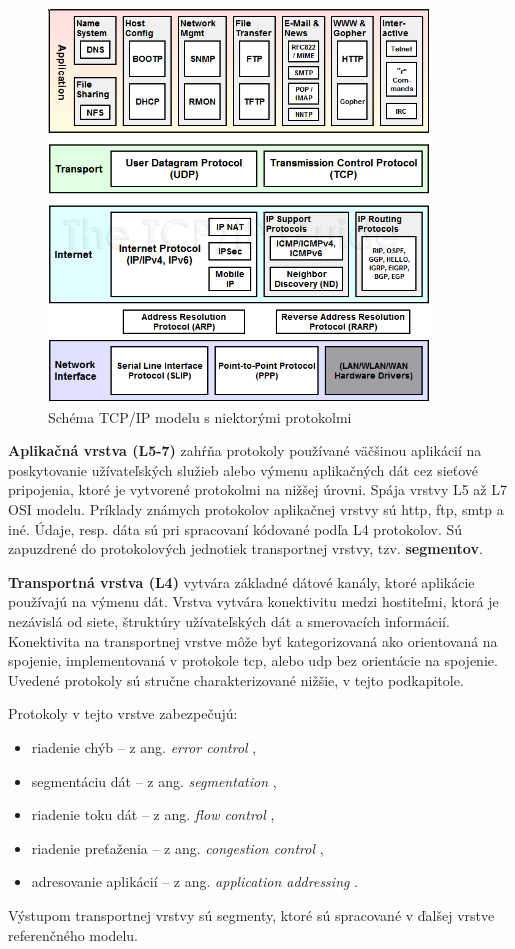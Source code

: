 \begin{figure}[!ht]
	\centering
	\includegraphics[width=0.9\textwidth]{figures/tcpipprot}
	\caption{Schéma TCP/IP modelu s niektorými protokolmi}
	\label{tcpipprot}
\end{figure}

\textbf{Aplikačná vrstva (L5-7)} zahŕňa protokoly používané väčšinou aplikácií na poskytovanie užívateľských služieb alebo výmenu aplikačných dát cez sieťové pripojenia, ktoré je vytvorené protokolmi na nižšej úrovni.  Spája vrstvy L5 až L7 OSI modelu. Príklady známych protokolov aplikačnej vrstvy sú \acrfull{http}, \acrfull{ftp}, \acrfull{smtp} a iné. Údaje, resp. dáta sú pri spracovaní kódované podľa L4 protokolov. Sú zapuzdrené do protokolových jednotiek transportnej vrstvy, tzv. \textbf{segmentov}.  

\textbf{Transportná vrstva (L4)} vytvára základné dátové kanály, ktoré aplikácie používajú na výmenu dát. Vrstva vytvára konektivitu medzi hostiteľmi, ktorá je nezávislá od siete, štruktúry užívateľských dát a smerovacích informácií. Konektivita na transportnej vrstve môže byť kategorizovaná ako orientovaná na spojenie, implementovaná v protokole \acrshort{tcp}, alebo \acrshort{udp} bez orientácie na spojenie. Uvedené protokoly sú stručne charakterizované nižšie, v tejto podkapitole. 

Protokoly v tejto vrstve zabezpečujú:
\begin{itemize}
	\item{riadenie chýb} -- z ang. \textit{error control} \cite{ec},
	\item{segmentáciu dát} -- z ang. \textit{segmentation} \cite{sd},
	\item{riadenie toku dát} -- z ang. \textit{flow control} \cite{fc},
	\item{riadenie preťaženia} -- z ang. \textit{congestion control} \cite{cc},
	\item{adresovanie aplikácií} -- z ang. \textit{application addressing} \cite{aa}.
\end{itemize}
Výstupom transportnej vrstvy sú segmenty, ktoré sú spracované v ďalšej vrstve referenčného modelu. 

